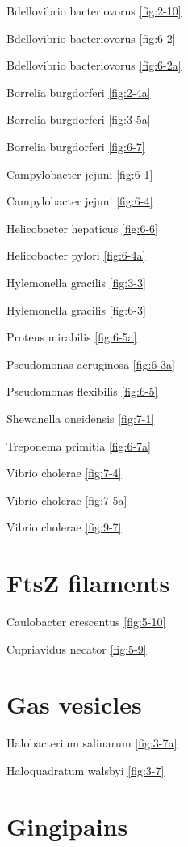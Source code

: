 \documentclass[]{tufte-book}
\begin{document}
Bdellovibrio bacteriovorus \ref{fig:2-10}

Bdellovibrio bacteriovorus \ref{fig:6-2}

Bdellovibrio bacteriovorus \ref{fig:6-2a}

Borrelia burgdorferi \ref{fig:2-4a}

Borrelia burgdorferi \ref{fig:3-5a}

Borrelia burgdorferi \ref{fig:6-7}

Campylobacter jejuni \ref{fig:6-1}

Campylobacter jejuni \ref{fig:6-4}

Helicobacter hepaticus \ref{fig:6-6}

Helicobacter pylori \ref{fig:6-4a}

Hylemonella gracilis \ref{fig:3-3}

Hylemonella gracilis \ref{fig:6-3}

Proteus mirabilis \ref{fig:6-5a}

Pseudomonas aeruginosa \ref{fig:6-3a}

Pseudomonas flexibilis \ref{fig:6-5}

Shewanella oneidensis \ref{fig:7-1}

Treponema primitia \ref{fig:6-7a}

Vibrio cholerae \ref{fig:7-4}

Vibrio cholerae \ref{fig:7-5a}

Vibrio cholerae \ref{fig:9-7}

\hypertarget{ftsz-filaments}{%
\section*{FtsZ filaments}\label{ftsz-filaments}}

Caulobacter crescentus \ref{fig:5-10}

Cupriavidus necator \ref{fig:5-9}

\hypertarget{gas-vesicles}{%
\section*{Gas vesicles}\label{gas-vesicles}}

Halobacterium salinarum \ref{fig:3-7a}

Haloquadratum walsbyi \ref{fig:3-7}

\hypertarget{gingipains}{%
\section*{Gingipains}\label{gingipains}}
\end{document}
